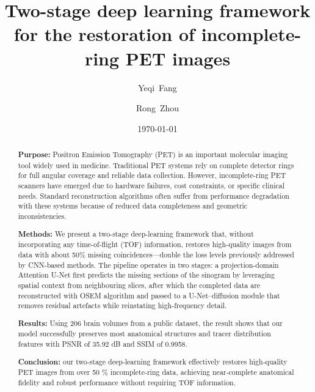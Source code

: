 \documentclass[aps,prb,preprint,groupedaddress,showkeys]{revtex4}
\begin{document}
\def\papertitle{Two-stage deep learning framework for the restoration of incomplete-ring PET images}
\title{\papertitle}

\author{Yeqi~Fang}
\author{Rong~Zhou}

\date{\today}

\begin{abstract}
\textbf{Purpose:} Positron Emission Tomography (PET) is an important molecular imaging tool widely used in medicine. Traditional PET systems rely on complete detector rings for full angular coverage and reliable data collection. However, incomplete-ring PET scanners have emerged due to hardware failures, cost constraints, or specific clinical needs. Standard reconstruction algorithms often suffer from performance degradation with these systems because of reduced data completeness and geometric inconsistencies.

\textbf{Methods:} We present a two-stage deep-learning framework that, without incorporating any time-of-flight (TOF) information, restores high-quality images from data with about 50\% missing coincidences—double the loss levels previously addressed by CNN-based methods. The pipeline operates in two stages: a projection-domain Attention U-Net first predicts the missing sections of the sinogram by leveraging spatial context from neighbouring slices, after which the completed data are reconstructed with OSEM algorithm and passed to a U-Net–diffusion module that removes residual artefacts while reinstating high-frequency detail.

\textbf{Results:} Using 206 brain volumes from a public dataset, the result shows that our model successfully preserves most anatomical structures and tracer distribution features with PSNR of 35.92 dB and SSIM of 0.9958.

\textbf{Conclusion:} our two-stage deep‐learning framework effectively restores high‐quality PET images from over 50 \% incomplete‐ring data, achieving near‐complete anatomical fidelity and robust performance without requiring TOF information.
\end{abstract}

\maketitle
\end{document}
